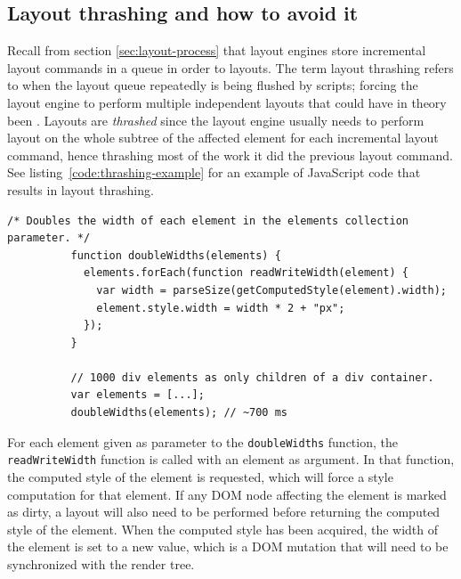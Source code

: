 \documentclass[a4paper,11pt]{kth-mag}
\newcommand{\code}[1]{\texttt{#1}}
\begin{document}
      \subsection{Layout thrashing and how to avoid it}\label{sec:layout-thrashing}
        Recall from section \ref{sec:layout-process} that \glspl{layout engine} store incremental layout commands in a queue in order to  layouts.
        The term \gls{layout thrashing} refers to when the layout queue repeatedly is being flushed by scripts; forcing the \gls{layout engine} to perform multiple independent layouts that could have in theory been .
        Layouts are \emph{thrashed} since the \gls{layout engine} usually needs to perform layout on the whole subtree of the affected element for each incremental layout command, hence thrashing most of the work it did the previous layout command.
        See listing~\ref{code:thrashing-example} for an example of \gls{JavaScript} code that results in \gls{layout thrashing}.
        \begin{lstlisting}[gobble=10,caption={Example of \gls{layout thrashing}. The code reads and doubles the widths of 1000 \glspl{element} in \textasciitilde700 ms. The \code{parseSize} function is not important to understand the example.}, captionpos=b, label={code:thrashing-example}]
          /* Doubles the width of each element in the elements collection parameter. */
          function doubleWidths(elements) {
            elements.forEach(function readWriteWidth(element) {
              var width = parseSize(getComputedStyle(element).width);
              element.style.width = width * 2 + "px";
            });
          }

          // 1000 div elements as only children of a div container.
          var elements = [...];
          doubleWidths(elements); // ~700 ms
        \end{lstlisting}
        For each element given as parameter to the \code{doubleWidths} function, the \code{readWriteWidth} function is called with an element as argument.
        In that function, the computed style of the element is requested, which will force a style computation for that \gls{element}.
        If any \gls{DOM} node affecting the element is marked as dirty, a layout will also need to be performed before returning the computed style of the \gls{element}.
        When the computed style has been acquired, the width of the \gls{element} is set to a new value, which is a \gls{DOM} mutation that will need to be synchronized with the \gls{render tree}.
\end{document}
